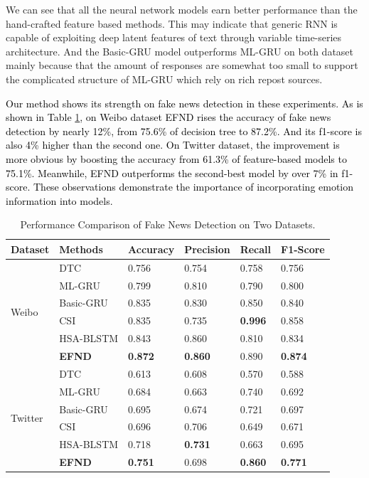 \documentclass[conference]{IEEEtran}
\newcommand{\m}{EFND}
\newcommand{\new}[1]{\textcolor{black}{{#1}}}
\begin{document}
	 We can see that all the neural network models earn better performance than the hand-crafted feature based methods. This may indicate that generic RNN is capable of exploiting deep latent features of text through variable time-series architecture. And the Basic-GRU model outperforms ML-GRU  on both dataset mainly because that the amount of responses are somewhat too small to support the complicated structure of ML-GRU which rely on rich repost sources. 
	
	\new{Our method shows its strength on fake news detection in these experiments. As is shown in Table \ref{tab:performanceofbaselines}, on Weibo dataset {\m} rises the accuracy of fake news detection by nearly 12\%, from 75.6\% of decision tree to 87.2\%. And its f1-score is also 4\% higher than the second one. On Twitter dataset, the improvement is more obvious by boosting the accuracy from 61.3\% of feature-based models to 75.1\%. Meanwhile, {\m} outperforms the second-best model by over 7\% in f1-score. These observations demonstrate the importance of incorporating emotion information into models.}
		\begin{table}[t]
		\centering
		\begin{tabular}{ l l l l l l}
			\toprule
			Dataset & Methods & Accuracy & Precision & Recall & F1-Score\\
			\hline
			\multirow{6}{*}{Weibo} 
			& DTC & 0.756 & 0.754  & 0.758 & 0.756\\
			& ML-GRU & 0.799  & 0.810 & 0.790 &0.800\\
			& Basic-GRU & 0.835 & 0.830 & 0.850 & 0.840\\
			& CSI &0.835 & 0.735 & {\bf 0.996} & 0.858\\
			& HSA-BLSTM & 0.843 & 0.860 & 0.810 & 0.834\\
			&{\bf {\m}} & {\bf 0.872} & {\bf 0.860} &  0.890 & {\bf 0.874}\\
			\hline
			\multirow{6}{*}{Twitter} 
			& DTC & 0.613 & 0.608  & 0.570 & 0.588\\
			& ML-GRU & 0.684  & 0.663 & 0.740 &0.692\\
			& Basic-GRU & 0.695 & 0.674 & 0.721 & 0.697\\
			&CSI &0.696 & 0.706 & 0.649 & 0.671\\
			& HSA-BLSTM & 0.718 & {\bf 0.731} & 0.663 & 0.695\\
			& {\bf {\m}} & {\bf 0.751} & 0.698 & {\bf 0.860} & {\bf 0.771}\\
			\bottomrule
		\end{tabular}
		\caption{Performance Comparison of Fake News Detection on Two Datasets.}
		\label{tab:performanceofbaselines}
	\end{table}
	
\end{document}
